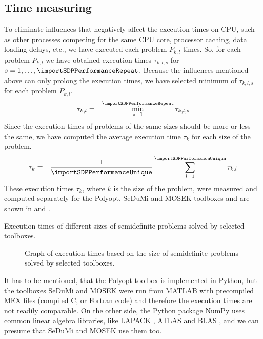 \subsection{Time measuring}
To eliminate influences that negatively affect the execution times on CPU, such as other processes competing for the same CPU core, processor caching, data loading delays, etc., we have executed each problem $P_{k,l}$ \importSDPPerformanceRepeat{} times.
So, for each problem $P_{k,l}$ we have obtained execution times $\tau_{k,l,s}$ for $s = 1,\ldots,\importSDPPerformanceRepeat$.
Because the influences mentioned above can only prolong the execution times, we have selected minimum of $\tau_{k,l,s}$ for each problem $P_{k,l}$.
\begin{eqnarray}
  \tau_{k,l} &=& \min_{s=1}^{\importSDPPerformanceRepeat} \tau_{k,l,s}
\end{eqnarray}
Since the execution times of problems of the same sizes should be more or less the same, we have computed the average execution time $\tau_k$ for each size of the problem.
\begin{eqnarray}
  \tau_k &=& \frac{1}{\importSDPPerformanceUnique}\sum_{l=1}^{\importSDPPerformanceUnique} \tau_{k,l}
\end{eqnarray}
These execution times $\tau_k$, where $k$ is the size of the problem, were measured and computed separately for the Polyopt, SeDuMi and MOSEK toolboxes and are shown in  and .

\begin{table}[ht]
  \centering
  
  \caption{Execution times of different sizes of semidefinite problems solved by selected toolboxes.}
\end{table}

\begin{figure}[ht]
  \centering
  \resizebox{0.95\textwidth}{!}{}
  \caption{Graph of execution times based on the size of semidefinite problems solved by selected toolboxes.}
\end{figure}

It has to be mentioned, that the Polyopt toolbox is implemented in Python, but the toolboxes SeDuMi and MOSEK were run from MATLAB with precompiled MEX files (compiled C, \CC{} or Fortran code) and therefore the execution times are not readily comparable.
On the other side, the Python package NumPy uses common linear algebra libraries, like LAPACK \cite{lapack}, ATLAS \cite{atlas} and BLAS \cite{blas}, and we can presume that SeDuMi and MOSEK use them too.

